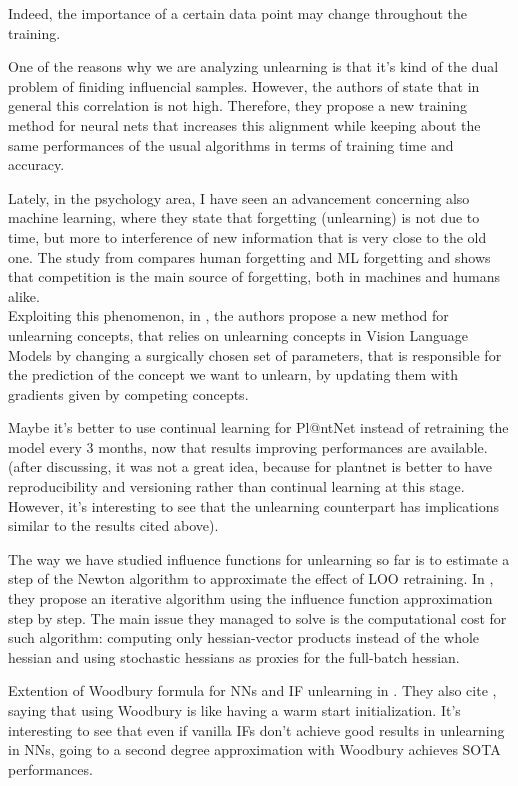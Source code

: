 \begin{itemize}
  Indeed, the importance of a certain data point may change throughout the training.
  \item One of the reasons why we are analyzing unlearning is that it's kind of the dual problem of finiding influencial samples.    However, the authors of \cite{pan_misalignment_2026} state that in general this correlation is not high. 
  Therefore, they propose a new training method for neural nets that increases this alignment while keeping about the same performances of the usual algorithms in terms of training time and accuracy.
  \item Lately, in the psychology area, I have seen an advancement concerning also machine learning, where they state that forgetting (unlearning) is not due to time, but more to interference of new information that is very close to the old one.
    The study from \cite{barman_geometry_2026} compares human forgetting and ML forgetting and shows that competition is the main source of forgetting, both in machines and humans alike.\\
    Exploiting this phenomenon, in \cite{competition_forgetting_2026}, the authors pro\-pose a new method for unlearning concepts, that relies on unlearning concepts in Vision Language Models by changing a surgically chosen set of parameters, that is responsible for the prediction of the concept we want to unlearn, by updating them with gradients given by competing concepts.
  \item Maybe it's better to use continual learning for Pl@ntNet instead of retraining the model every 3 months, now that results improving perfor\-mances \cite{catastrophic_forgetting_2026} are available.
  (after discussing, it was not a great idea, because for plantnet is better to have reproducibility and versioning rather than continual learning at this stage. However, it's interesting to see that the unlearning counterpart has implications similar to the results cited above).   
  {\color{RoyalBlue}
    \item The way we have studied influence functions for unlearning so far is to estimate a step of the Newton algorithm to approximate the effect of LOO retraining.
    In \cite{bui2026batch}, they propose an iterative algorithm using the influence function approximation step by step. The main issue they managed to solve is the computa\-tional cost for such algorithm:
    computing only hessian-vector products instead of the whole hessian and using stochastic hessians as proxies for the full-batch hessian.
    \item Extention of Woodbury formula for NNs and IF unlearning in \cite{zhao_win-u_2026}. They also cite \cite{bae_if_2022}, saying that using Woodbury is like having a warm start initialization.
    It's interesting to see that even if vanilla IFs don't achieve good results in unlearning in NNs, going to a second degree approximation with Woodbury achieves SOTA performances.
    } 
\end{itemize}